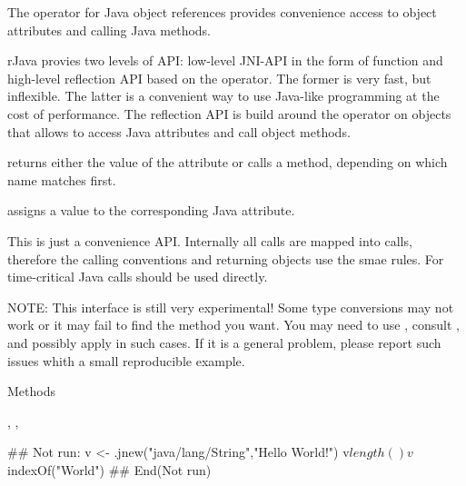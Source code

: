 \begin{Description}\relax
The \code{\$} operator for  Java object references provides convenience access to object attributes and calling Java methods.
\end{Description}
\begin{Details}\relax
rJava provies two levels of API: low-level JNI-API in the form of  function and high-level reflection API based on the \code{\$} operator. The former is very fast, but inflexible. The latter is a convenient way to use Java-like programming at the cost of performance. The reflection API is build around the \code{\$} operator on  objects that allows to access Java attributes and call object methods.

\code{\$} returns either the value of the attribute or calls a method, depending on which name matches first.

\code{\$<-} assigns a value to the corresponding Java attribute.

This is just a convenience API. Internally all calls are mapped into  calls, therefore the calling conventions and returning objects use the smae rules. For time-critical Java calls  should be used directly.

NOTE: This interface is still very experimental! Some type conversions may not work or it may fail to find the method you want. You may need to use , consult ,  and possibly apply  in such cases. If it is a general problem, please report such issues whith a small reproducible example.
\end{Details}
\begin{Section}{Methods}
\end{Section}
\begin{SeeAlso}\relax
{}, , 
\end{SeeAlso}
\begin{Examples}
\begin{ExampleCode}
## Not run: 
v <- .jnew("java/lang/String","Hello World!")
v$length()
v$indexOf("World")
## End(Not run)
\end{ExampleCode}
\end{Examples}

